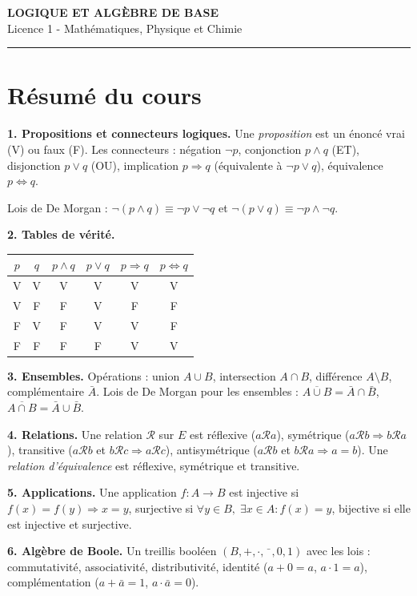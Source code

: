 \documentclass[12pt,a4paper]{article}
\begin{document}
\fi

\begin{center}
  {\LARGE\bfseries LOGIQUE ET ALGÈBRE DE BASE}\\[0.3cm]
  {\normalsize Licence 1 - Mathématiques, Physique et Chimie}\\[0.1cm]
  \rule{0.7\textwidth}{0.8pt}
\end{center}

\section*{Résumé du cours}

\begin{boiteresume}

\textbf{1. Propositions et connecteurs logiques.} Une \textit{proposition} est un énoncé vrai (V) ou faux (F). Les connecteurs : négation $\neg p$, conjonction $p\wedge q$ (ET), disjonction $p\vee q$ (OU), implication $p\Rightarrow q$ (équivalente à $\neg p\vee q$), équivalence $p\Leftrightarrow q$.

Lois de De Morgan : $\neg(p\wedge q)\equiv\neg p\vee\neg q$ et $\neg(p\vee q)\equiv\neg p\wedge\neg q$.

\textbf{2. Tables de vérité.}
\begin{center}
\begin{tabular}{cc|cccc}
$p$ & $q$ & $p\wedge q$ & $p\vee q$ & $p\Rightarrow q$ & $p\Leftrightarrow q$\\
\hline
V & V & V & V & V & V\\
V & F & F & V & F & F\\
F & V & F & V & V & F\\
F & F & F & F & V & V\\
\end{tabular}
\end{center}

\textbf{3. Ensembles.} Opérations : union $A\cup B$, intersection $A\cap B$, différence $A\setminus B$, complémentaire $\bar{A}$. Lois de De Morgan pour les ensembles : $\overline{A\cup B}=\bar{A}\cap\bar{B}$, $\overline{A\cap B}=\bar{A}\cup\bar{B}$.

\textbf{4. Relations.} Une relation $\mathcal{R}$ sur $E$ est réflexive ($a\mathcal{R}a$), symétrique ($a\mathcal{R}b\Rightarrow b\mathcal{R}a$), transitive ($a\mathcal{R}b$ et $b\mathcal{R}c\Rightarrow a\mathcal{R}c$), antisymétrique ($a\mathcal{R}b$ et $b\mathcal{R}a\Rightarrow a=b$). Une \textit{relation d'équivalence} est réflexive, symétrique et transitive.

\textbf{5. Applications.} Une application $f:A\to B$ est injective si $f(x)=f(y)\Rightarrow x=y$, surjective si $\forall y\in B,\;\exists x\in A:f(x)=y$, bijective si elle est injective et surjective.

\textbf{6. Algèbre de Boole.} Un treillis booléen $(B,+,\cdot,\bar{\phantom{x}},0,1)$ avec les lois : commutativité, associativité, distributivité, identité ($a+0=a$, $a\cdot1=a$), complémentation ($a+\bar{a}=1$, $a\cdot\bar{a}=0$).

\end{boiteresume}
\end{document}
